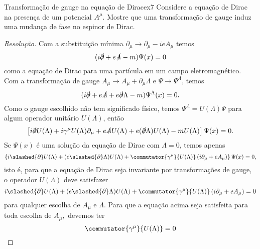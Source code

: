 \begin{exercício}{Transformação de gauge na equação de Dirac}{ex7}
    Considere a equação de Dirac na presença de um potencial \(A^\mu.\) Mostre que uma transformação de gauge induz uma mudança de fase no espinor de Dirac.
\end{exercício}
\begin{proof}[Resolução]
    Com a substituição mínima \(\partial_\mu \to \partial_\mu - i e A_\mu\) temos
    \begin{equation*}
        (i \slashed{\partial} + e \slashed{A} - m)\Psi(x) = 0
    \end{equation*}
    como a equação de Dirac para uma partícula em um campo eletromagnético. Com a transformação de gauge \(A_\mu \to A_\mu + \partial_\mu \Lambda\) e \(\Psi \to \Psi^\Lambda\), temos
    \begin{equation*}
        (i \slashed{\partial} + e \slashed{A} + e \slashed{\partial}\Lambda - m) \Psi^{\Lambda}(x) = 0.
    \end{equation*}
    Como o gauge escolhido não tem significado físico, temos \(\Psi^\Lambda = U(\Lambda) \Psi\) para algum operador unitário \(U(\Lambda)\), então
    \begin{align*}
        \left[i \slashed{\partial}U(\Lambda) +  i \gamma^\mu U(\Lambda) \partial_\mu + e \slashed{A} U(\Lambda) + e (\slashed{\partial} \Lambda) U(\Lambda) - m U(\Lambda)\right] \Psi(x) = 0.
    \end{align*}
    Se \(\Psi(x)\) é uma solução da equação de Dirac com \(\Lambda = 0\), temos apenas
    \begin{equation*}
        \left\{i \slashed{\partial} U(\Lambda) + (e \slashed{\partial} \Lambda) U(\Lambda) + \commutator{\gamma^\mu}{U(\Lambda)} \left(i\partial_\mu + e A_\mu\right)\right\}\Psi(x) = 0,
    \end{equation*}
    isto é, para que a equação de Dirac seja invariante por transformações de gauge, o operador \(U(\Lambda)\) deve satisfazer
    \begin{equation*}
        i \slashed{\partial} U(\Lambda) + (e \slashed{\partial} \Lambda) U(\Lambda) + \commutator{\gamma^\mu}{U(\Lambda)} \left(i\partial_\mu + e A_\mu\right) = 0
    \end{equation*}
    para qualquer escolha de \(A_\mu\) e \(\Lambda.\) Para que a equação acima seja satisfeita para toda escolha de \(A_\mu,\) devemos ter
    \begin{equation*}
        \commutator{\gamma^\mu}{U(\Lambda)} = 0
    \end{equation*}

\end{proof}

